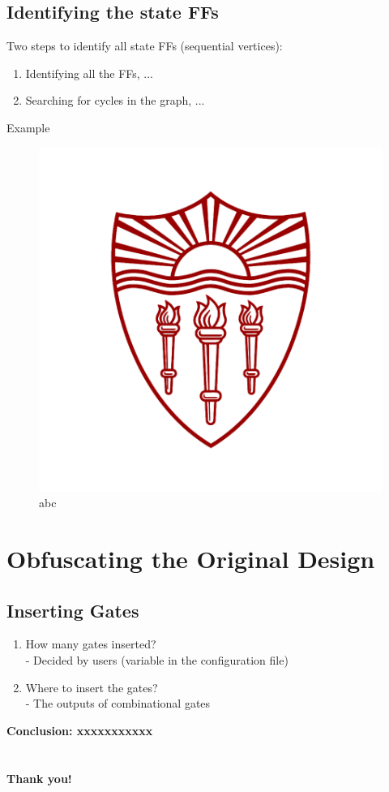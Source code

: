 \documentclass{beamer}
\begin{document}
\subsection{Identifying the state FFs}
\begin{frame}
\begin{block}{Two steps to identify all state FFs (sequential vertices):}
\begin{enumerate}
\item Identifying all the FFs, ...
\item Searching for cycles in the graph, ... 
\end{enumerate}
\end{block}

\begin{block}{Example}
\begin{figure}[H]
\includegraphics[width=0.3\columnwidth]{USC.png}
\caption{abc}
\label{abc}
\end{figure}
\end{block}

\end{frame}


\section{Obfuscating the Original Design}


\subsection{Inserting Gates}
\begin{frame}
\begin{enumerate}[Q1:]
\item How many gates inserted? \\
- Decided by users (variable in the configuration file)
\item Where to insert the gates? \\
- The outputs of combinational gates 
\end{enumerate}
{\bf Conclusion: xxxxxxxxxxx}
\end{frame}


\section{}
\begin{frame}
\begin{center} {\bfseries \Large Thank you!} \end{center}
\end{frame}


\end{document}
